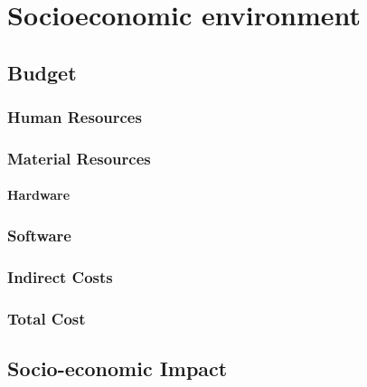 \chapter{Socioeconomic environment}\label{chap:economic-env}

\section{Budget}

\subsection{Human Resources}

\subsection{Material Resources}
\subsubsection{Hardware}

\subsection{Software}

\subsection{Indirect Costs}

\subsection{Total Cost}

\section{Socio-economic Impact}